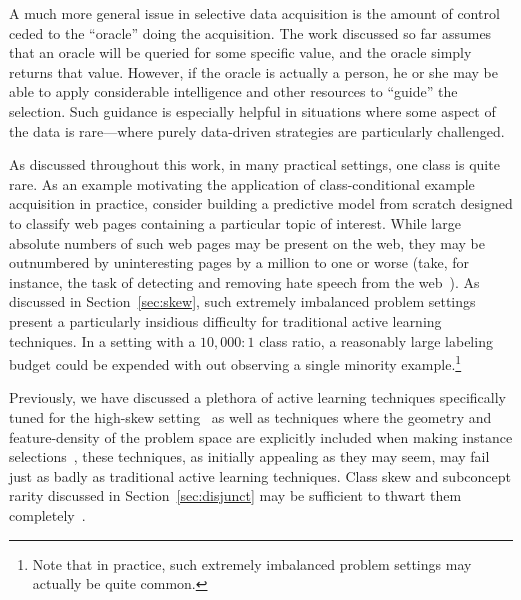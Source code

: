 A much more general issue in selective data acquisition is the amount of control ceded to the ``oracle'' doing the acquisition.  The work discussed so far assumes that an oracle will be queried for some specific value, and the oracle simply returns that value.  However, if the oracle is actually a person, he or she may be able to apply considerable intelligence and other resources to ``guide'' the selection.  Such guidance is especially helpful in situations where some aspect of the data is rare---where purely data-driven strategies are particularly challenged.

As discussed throughout this work, in many practical settings, one class is quite rare. As an example motivating the application of class-conditional example acquisition in practice, consider building a predictive model from scratch designed to classify web pages containing a particular topic of interest. While large absolute numbers of such web pages may be present on the web, they may be outnumbered by uninteresting pages by a million to one or worse (take, for instance, the task of detecting and removing hate speech from the web~\cite{attprovkdd2010}). As discussed in Section~\ref{sec:skew}, such extremely imbalanced problem settings present a particularly insidious difficulty for traditional active learning techniques. In a setting with a $10,000:1$ class ratio, a reasonably large labeling budget could be expended with out observing a single minority example.\footnote{Note that in practice, such extremely imbalanced problem settings may actually be quite common.}

Previously, we have discussed a plethora of active learning techniques specifically tuned for the high-skew setting~\cite{tomanek2009imbalance, bloodgood2009imbalance, zhu2007imbalance, Ertekin2_2007} as well as techniques where the geometry and feature-density of the problem space are explicitly included when making instance selections~\cite{zhuDensity2008, he2007rarecategory, donmez2008psd, nguyen2004preclustering, xu03representitive, cmccallum98em}, these techniques, as initially appealing as they may seem, may fail just as badly as traditional active learning techniques. Class skew and subconcept rarity discussed in Section~\ref{sec:disjunct} may be sufficient to thwart them completely~\cite{attprovkdd2010, attenberg:2010inactive}.


